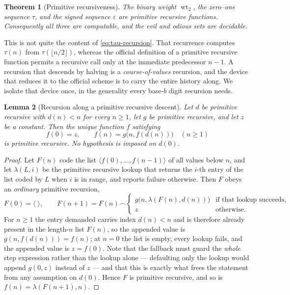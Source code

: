 \documentclass[11pt,oneside]{article}
\numberwithin{equation}{section}
\newtheorem{theorem}{Theorem}[section]
\newtheorem{lemma}[theorem]{Lemma}
\theoremstyle{definition}
\theoremstyle{remark}
\newcommand{\wt}{\operatorname{wt}_2}
\newcommand{\eps}{\varepsilon}
\begin{document}
\begin{theorem}[Primitive recursiveness]
\label{thm:primitive-recursive}
The binary weight \(\wt\), the zero--one sequence \(\tau\), and the
signed sequence \(\eps\) are primitive recursive functions.
Consequently all three are computable, and the evil and odious sets are
decidable.
\end{theorem}

This is not quite the content of \eqref{eq:tau-recursion}.  That
recurrence computes \(\tau(n)\) from \(\tau(\lfloor n/2\rfloor)\),
whereas the official definition of a primitive recursive function permits
a recursive call only at the immediate predecessor \(n-1\).  A recursion
that descends by halving is a \emph{course-of-values} recursion, and the
device that reduces it to the official scheme is to carry the entire
history along.  We isolate that device once, in the generality every
base-\(b\) digit recursion needs.

\begin{lemma}[Recursion along a primitive recursive descent]
\label{lem:descent-recursion}
Let \(d\) be primitive recursive with \(d(n)<n\) for every
\(n\ge1\), let \(g\) be primitive recursive, and let \(z\) be a
constant.  Then the unique function \(f\) satisfying
\begin{equation}
  f(0)=z,
  \qquad
  f(n)=g\bigl(n,f(d(n))\bigr)\quad(n\ge1)
  \label{eq:descent-recursion}
\end{equation}
is primitive recursive.  No hypothesis is imposed on \(d(0)\).
\end{lemma}

\begin{proof}
Let \(F(n)\) code the list \(\langle f(0),\ldots,f(n-1)\rangle\) of
all values below \(n\), and let \(\lambda(L,i)\) be the primitive
recursive lookup that returns the \(i\)-th entry of the list coded by
\(L\) when \(i\) is in range, and reports failure otherwise.  Then
\(F\) obeys an \emph{ordinary} primitive recursion,
\[
  F(0)=\langle\;\rangle,
  \qquad
  F(n+1)=F(n)\frown
  \begin{cases}
    g\bigl(n,\lambda(F(n),d(n))\bigr)
      &\text{if that lookup succeeds},\\
    z&\text{otherwise.}
  \end{cases}
\]
For \(n\ge1\) the entry demanded carries index \(d(n)<n\) and is
therefore already present in the length-\(n\) list \(F(n)\), so the
appended value is \(g(n,f(d(n)))=f(n)\); at \(n=0\) the list is empty,
every lookup fails, and the appended value is \(z=f(0)\).  Note that the
fallback must guard the \emph{whole} step expression rather than the
lookup alone --- defaulting only the lookup would append \(g(0,z)\)
instead of \(z\) --- and that this is exactly what frees the statement
from any assumption on \(d(0)\).  Hence \(F\) is primitive recursive,
and so is \(f(n)=\lambda(F(n+1),n)\).
\end{proof}
\end{document}
